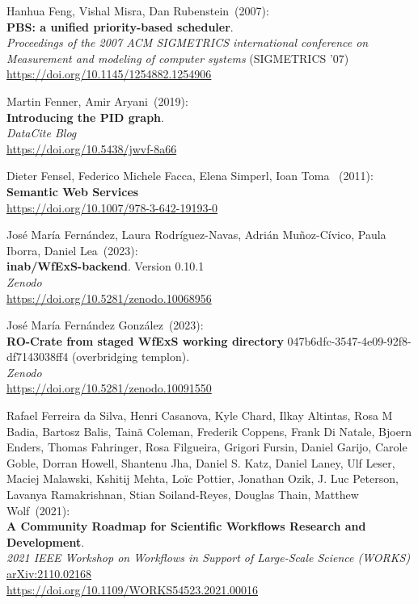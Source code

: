 \begin{thebibliography}{9}
Hanhua Feng, Vishal Misra, Dan Rubenstein~(2007): \\
\textbf{PBS: a unified priority-based scheduler}.\\
\emph{Proceedings of the 2007 ACM SIGMETRICS international conference on Measurement and modeling of computer systems} (SIGMETRICS '07)\\
\url{https://doi.org/10.1145/1254882.1254906} 

Martin Fenner, Amir Aryani~(2019): \\
\textbf{Introducing the PID graph}. \\
\emph{DataCite Blog}\\
\url{https://doi.org/10.5438/jwvf-8a66}

Dieter Fensel, Federico Michele Facca, Elena Simperl, Ioan Toma
~(2011): \\
\textbf{Semantic {Web Services}}\\
\url{https://doi.org/10.1007/978-3-642-19193-0}

José María Fernández, Laura Rodríguez-Navas, Adrián Muñoz-Cívico, Paula Iborra, Daniel Lea~(2023): \\
\textbf{inab/WfExS-backend}. Version 0.10.1\\
\emph{Zenodo} \\
\url{https://doi.org/10.5281/zenodo.10068956}

José María Fernández González~(2023): \\
\textbf{RO-Crate from staged WfExS working directory} 047b6dfc-3547-4e09-92f8-df7143038ff4 (overbridging templon).\\
\emph{Zenodo} \\
\url{https://doi.org/10.5281/zenodo.10091550}

Rafael Ferreira da Silva, Henri Casanova, Kyle Chard, Ilkay
Altintas, Rosa M Badia, Bartosz Balis, Tainã Coleman, Frederik Coppens,
Frank Di Natale, Bjoern Enders, Thomas Fahringer, Rosa Filgueira,
Grigori Fursin, Daniel Garijo, Carole Goble, Dorran Howell, Shantenu
Jha, Daniel S. Katz, Daniel Laney, Ulf Leser, Maciej Malawski, Kshitij
Mehta, Loïc Pottier, Jonathan Ozik, J. Luc Peterson, Lavanya
Ramakrishnan, Stian Soiland-Reyes, Douglas Thain, Matthew Wolf~(2021): \\
\textbf{A Community Roadmap for Scientific Workflows Research and Development}.\\
\emph{2021 IEEE Workshop on Workflows in Support of Large-Scale Science (WORKS)}\\
\href{https://doi.org/10.48550/arXiv.2110.02168}{arXiv:2110.02168}\\
\url{https://doi.org/10.1109/WORKS54523.2021.00016}


\end{thebibliography}
